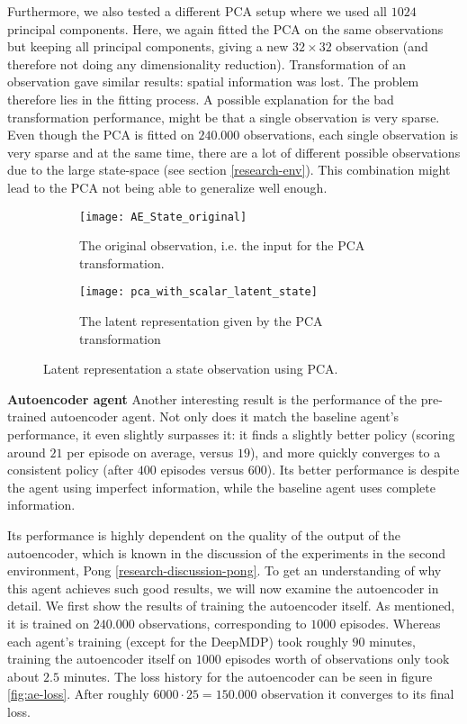 Furthermore, we also tested a different PCA setup where we used all $1024$ principal components. Here, we again fitted the PCA on the same observations but keeping all principal components, giving a new $32 \times 32$ observation (and therefore not doing any dimensionality reduction). Transformation of an observation gave similar results: spatial information was lost. The problem therefore lies in the fitting process. A possible explanation for the bad transformation performance, might be that a single observation is very sparse. Even though the PCA is fitted on $240.000$ observations, each single observation is very sparse and at the same time, there are a lot of different possible observations due to the large state-space (see section \ref{research-env}). This combination might lead to the PCA not being able to generalize well enough. \newline

\begin{figure}[h!]
	\centering
	\begin{subfigure}[b]{0.75\textwidth}
		\texttt{[image: AE\_State\_original]}
		\caption{The original observation, i.e. the input for the PCA transformation.}
		\label{fig:pca-original} 
	\end{subfigure}
	\begin{subfigure}[b]{0.75\textwidth}
		\texttt{[image: pca\_with\_scalar\_latent\_state]}
		\caption{The latent representation given by the PCA transformation}
		\label{fig:pca-latent}
	\end{subfigure}
	\caption{Latent representation a state observation using PCA.}
	\label{fig:pca-state}
\end{figure}

\noindent \textbf{Autoencoder agent}\newline
\noindent
Another interesting result is the performance of the pre-trained autoencoder agent. Not only does it match the baseline agent's performance, it even slightly surpasses it: it finds a slightly better policy (scoring around $21$ per episode on average, versus $19$), and more quickly converges to a consistent policy (after $400$ episodes versus $600$). Its better performance is despite the agent using imperfect information, while the baseline agent uses complete information.

Its performance is highly dependent on the quality of the output of the autoencoder, which is known in the discussion of the experiments in the second environment, Pong \ref{research-discussion-pong}. To get an understanding of why this agent achieves such good results, we will now examine the autoencoder in detail. We first show the results of training the autoencoder itself. As mentioned, it is trained on $240.000$ observations, corresponding to $1000$ episodes. Whereas each agent's training (except for the DeepMDP) took roughly $90$ minutes, training the autoencoder itself on $1000$ episodes worth of observations only took about $2.5$ minutes. The loss history for the autoencoder can be seen in figure \ref{fig:ae-loss}. After roughly $6000 \cdot 25 = 150.000$ observation it converges to its final loss.

